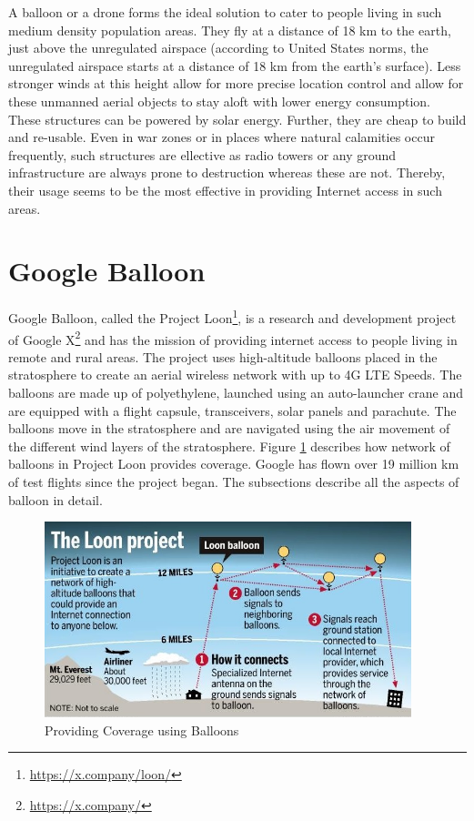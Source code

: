 \documentclass{llncs}
\begin{document}
     A balloon or a drone forms the ideal solution to cater to people living in such medium density population areas. 
     They fly at a distance of 18 km to the earth, just above the unregulated airspace (according to United States 
     norms, the unregulated airspace starts at a distance of 18 km from the earth's surface\cite{us_airspace}). Less stronger winds at
     this height allow for more precise location control and allow for these unmanned aerial objects to stay aloft 
     with lower energy consumption. These structures can be powered by solar energy. Further, they are cheap to build
     and re-usable. Even in war zones or in places where natural calamities occur frequently, such structures are 
     ellective as radio towers or any ground infrastructure are always prone to destruction whereas these are not. 
     Thereby, their usage seems to be the most effective in providing Internet access in such areas.     
	
\section{Google Balloon}
Google Balloon, called the Project Loon\footnote{\url{https://x.company/loon/}}, 
is a research and development project of Google X\footnote{\url{https://x.company/}} and has the mission of
providing internet access to people living in remote and rural areas. The project uses high-altitude balloons placed in 
the stratosphere to create an aerial wireless network with up to 4G LTE Speeds. The balloons are made up of polyethylene, 
launched using an auto-launcher crane and are equipped with a flight capsule, transceivers, solar panels and parachute. The 
balloons move in the stratosphere and are navigated using the air movement of the different wind layers of the stratosphere.
Figure \ref{fig:balloon_coverage} describes how network of balloons in Project Loon provides coverage. Google has flown over 19 million km of test flights since the project began. The subsections describe all the aspects of 
balloon in detail.  	

\begin{figure}[ht]
	\centering
	\includegraphics[width=0.95\textwidth]{fig3}
	\caption{Providing Coverage using Balloons}
	\label{fig:balloon_coverage}
    \end{figure}
	
\end{document}
